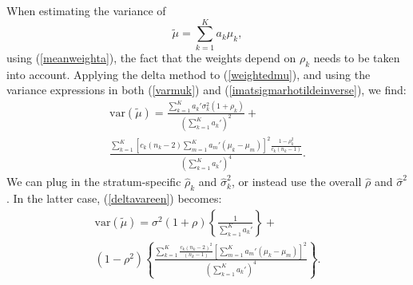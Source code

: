 \documentclass[11pt,a5paper,twoside]{book}
\begin{document}
When estimating the variance of
\begin{equation}
\widetilde{\mu}=\sum_{k=1}^Ka_k\mu_k,
\label{weightedmu}
\end{equation}
 using (\ref{meanweighta}), the fact that the weights depend on $\rho_k$ needs to be taken into account. Applying the delta method to (\ref{weightedmu}), and using the variance expressions in both (\ref{varmuk}) and (\ref{imatsigmarhotildeinverse}), we find:
\begin{multline}
\label{deltavareen}
\mbox{var}(\widetilde{\mu})=
\frac{
\sum_{k=1}^Ka_k'\sigma^2_k(1+\rho_k)
}{
\left(\sum_{k=1}^Ka_k'\right)^2
}
+\\
\frac{
\sum_{k=1}^K\left[c_k(n_k-2)\sum_{m=1}^Ka_m'(\mu_k-\mu_m)\right]^2\frac{1-\rho^2_k}{c_k(n_k-1)}
}
{
\left(\sum_{k=1}^Ka_k'\right)^4
}.
\end{multline}
We can plug in the stratum-specific $\widehat{\rho}_k$ and $\widehat{\sigma}^2_k$, or instead use the overall $\widehat{\rho}$ and $\widehat{\sigma}^2$. In the latter case, (\ref{deltavareen}) becomes:
\begin{multline}
\label{deltavartwee}
\mbox{var}(\widetilde{\mu})=
\sigma^2(1+\rho)
\left\{
\frac{
1
}{
\sum_{k=1}^Ka_k'
}
\right\}
+\\
(1-\rho^2)
\left\{
\frac{
\sum_{k=1}^K\frac{c_k(n_k-2)^2}{(n_k-1)}\left[\sum_{m=1}^Ka_m'(\mu_k-\mu_m)\right]^2
}
{
\left(\sum_{k=1}^Ka_k'\right)^4
}
\right\}.
\end{multline}
\end{document}

